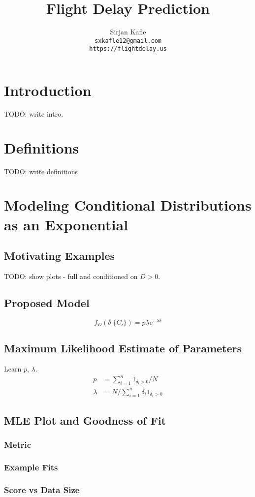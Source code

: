 \documentclass{article}
\title{Flight Delay Prediction}
\author{%
  Sirjan Kafle \\
  \texttt{sxkafle12@gmail.com} \\
  \texttt{https://flightdelay.us}
}
\begin{document}
\maketitle

\section{Introduction}
TODO: write intro.

\section{Definitions}
TODO: write definitions

\section{Modeling Conditional Distributions as an Exponential}
\subsection{Motivating Examples}
TODO: show plots - full and conditioned on $D > 0$.

\subsection{Proposed Model}
$$f_D(\delta|\{C_i\}) = p\lambda e^{-\lambda \delta}$$

\subsection{Maximum Likelihood Estimate of Parameters}
Learn $p$, $\lambda$.
\begin{align*}
    p &= \sum_{i=1}^n 1_{\delta_i > 0} / N \\
    \lambda &= N / \sum_{i=1}^n \delta_i 1_{\delta_i > 0}
\end{align*}

\subsection{MLE Plot and Goodness of Fit}
\subsubsection{Metric}
\subsubsection{Example Fits}
\subsubsection{Score vs Data Size}
\end{document}
